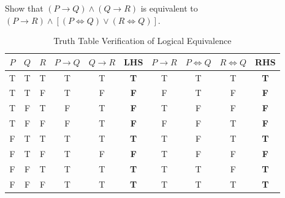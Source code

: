 \documentclass[addpoints,12pt]{exam}
\begin{document}
\begin{questions}

\question  Show that $(P \rightarrow Q) \land (Q \rightarrow R)$ is equivalent to $(P \rightarrow R) \land [(P \iff
Q)\vee (R \iff Q)]$.


\begin{table}[h!]
\centering
\caption{Truth Table Verification of Logical Equivalence}
\label{tab:truth_table}
\begin{tabular}{|c|c|c||c|c|c||c|c|c|c|}
\hline
$P$ & $Q$ & $R$ & $P \rightarrow Q$ & $Q \rightarrow R$ & \textbf{LHS} & $P \rightarrow R$ & $P \iff Q$ & $R \iff Q$ & \textbf{RHS} \\ \hline
T   & T   & T   & T                 & T                 & \textbf{T}   & T                 & T          & T          & \textbf{T}   \\ \hline
T   & T   & F   & T                 & F                 & \textbf{F}   & F                 & T          & F          & \textbf{F}   \\ \hline
T   & F   & T   & F                 & T                 & \textbf{F}   & T                 & F          & F          & \textbf{F}   \\ \hline
T   & F   & F   & F                 & T                 & \textbf{F}   & F                 & F          & T          & \textbf{F}   \\ \hline
F   & T   & T   & T                 & T                 & \textbf{T}   & T                 & F          & T          & \textbf{T}   \\ \hline
F   & T   & F   & T                 & F                 & \textbf{F}   & T                 & F          & F          & \textbf{F}   \\ \hline
F   & F   & T   & T                 & T                 & \textbf{T}   & T                 & T          & F          & \textbf{T}   \\ \hline
F   & F   & F   & T                 & T                 & \textbf{T}   & T                 & T          & T          & \textbf{T}   \\ \hline
\end{tabular}
\end{table}


\end{questions}
\end{document}
